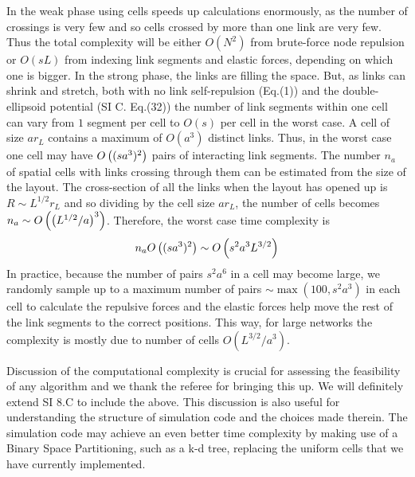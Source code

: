 \documentclass[11pt]{article}
\begin{document}
\begin{response}
In the weak phase using cells speeds up calculations enormously, as the number of crossings is very few and so cells crossed by more than one link are very few. 
Thus the total complexity will be either $O(N^2)$ from brute-force node repulsion or $O(sL)$ from indexing link segments and elastic forces, depending on which one is bigger.
In the strong phase, the links are filling the space.
But, as links can shrink and stretch, both with no link self-repulsion (Eq.(1)) and the double-ellipsoid potential (SI C. Eq.(32)) the number of link segments within one cell can vary from $1$ segment per cell to $O(s)$ per cell in the worst case.
A cell of size $ar_L$ contains a maximum of $O(a^3)$ distinct links. 
Thus, in the worst case one cell may have $O\left((sa^3)^2\right)$ pairs of interacting link segments. 
The number $n_a$ of spatial cells with links crossing through them can be estimated from the size of the layout. 
The cross-section of all the links when the layout has opened up is $R\sim L^{1/2} r_L$ and so dividing by the cell size $ar_L$, the number of cells becomes $n_a \sim O\left(\left(L^{1/2}/a\right)^3\right)$. 
Therefore, the worst case time complexity is 
\[n_a O\left((sa^3)^2\right) \sim  O\left({ s^2 a^3  L^{3/2} } \right) \]
In practice, because the number of pairs $s^2 a^6$ in a cell may become large, we randomly sample up to a maximum number of pairs $\sim \max (100, s^2 a^3)$ in each cell to calculate the repulsive forces and the elastic forces help move the rest of the link segments to the correct positions. 
This way, for large networks the complexity is mostly due to number of cells $O(L^{3/2}/a^3)$.



Discussion of the computational complexity is crucial for assessing the feasibility of any algorithm and we thank the referee for bringing this up. 
We will definitely extend SI 8.C to include the above.
This discussion is also useful for understanding the structure of  simulation code and the choices made therein.
The simulation code may achieve an even better time complexity by making use of a Binary Space Partitioning, such as a k-d tree, replacing the uniform cells that we have currently implemented.


\end{response}
\end{document}
